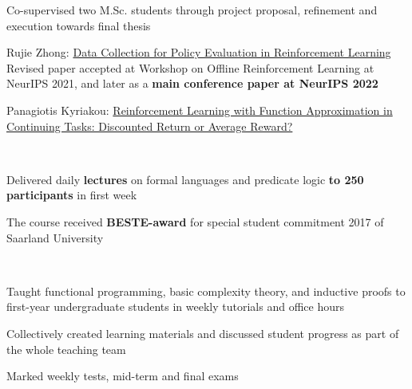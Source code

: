 \documentclass[]{lukas-cv-openfont}
\begin{document}
\begin{tightitemize}{1.7em}
    \item Co-supervised two M.Sc. students through project proposal, refinement and execution towards final thesis
    \item Rujie Zhong: \href{https://agents.inf.ed.ac.uk/blog/master-dissertations/rzhong_msc2021.pdf}{Data Collection for Policy Evaluation in Reinforcement Learning}\\
    Revised paper accepted at Workshop on Offline Reinforcement Learning at NeurIPS 2021, and later as a \textbf{main conference paper at NeurIPS 2022} \cite{zhong2022datacollection}
    \item Panagiotis Kyriakou: \href{https://agents.inf.ed.ac.uk/blog/master-dissertations/pkyriakou_msc2021.pdf}{Reinforcement Learning with Function Approximation in Continuing Tasks: Discounted Return or Average Reward?}
\end{tightitemize}
\largesectionsep

\noindent
{}
\\
\begin{tightitemize}{1.7em}
    \item Delivered daily \textbf{lectures} on formal languages and predicate logic \textbf{to 250 participants} in first week
    \item The course received \textbf{BESTE-award} for special student commitment 2017 of Saarland University
\end{tightitemize}
\largesectionsep

\noindent
{}
\\
\begin{tightitemize}{1.7em}
    \item Taught functional programming, basic complexity theory, and inductive proofs to first-year undergraduate students in weekly tutorials and office hours
    \item Collectively created learning materials and discussed student progress as part of the whole teaching team
    \item Marked weekly tests, mid-term and final exams
\end{tightitemize}
\largesectionsep
\end{document}
